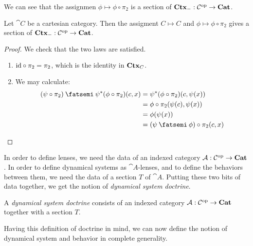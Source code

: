 \documentclass[DynamicalBook]{subfiles}
\begin{document}
We can see that the assignmen $\phi \mapsto \phi \circ \pi_2$ is a section of
$\textbf{Ctx}_{-} : \mathcal{C}^{\textnormal{op}} \to \textbf{Cat}$.
\begin{proposition}\label{prop.section_discrete}
Let $\cat{C}$ be a cartesian category. Then the assigment $C \mapsto C$ and
$\phi \mapsto \phi \circ \pi_2$ gives a section of $\textbf{Ctx}_{-} : \mathcal{C}^{\textnormal{op}} \to \textbf{Cat}$.
\end{proposition}
\begin{proof}
  We check that the two laws are satisfied.
  \begin{enumerate}
     \item $\mathrm{id} \circ \pi_2 = \pi_2$, which is the identity in $\textbf{Ctx}_{C}$.
     \item We may calculate:
       \begin{align*}
         (\psi \circ \pi_2) \then \psi^{\ast}(\phi \circ \pi_2)(c, x) &= \psi^{\ast}(\phi \circ \pi_2)(c, \psi(x)) \\
                                                                      &= \phi \circ \pi_2 (\psi(c), \psi(x)) \\
                                                                      &= \phi(\psi(x)) \\
         &= (\psi \then \phi) \circ \pi_2 (c, x)
       \end{align*}
  \end{enumerate}
\end{proof}

In order to define lenses, we need the data of an indexed category $\mathcal{A} :
\mathcal{C}^{\textnormal{op}} \to \textbf{Cat}$. In order to define dynamical systems as
$\cat{A}$-lenses, and to define the behaviors between them, we need the data of
a section $T$ of $\cat{A}$. Putting these two bits of data together, we get the
notion of \emph{dynamical system doctrine}.

\begin{definition}\label{def.doctrine}
A \emph{dynamical system doctrine} consists of an indexed category $\mathcal{A} :
\mathcal{C}^{\textnormal{op}} \to \textbf{Cat}$ together with a section $T$.
\end{definition}

Having this definition of doctrine in mind, we can now define the notion of
dynamical system and behavior in complete generality.
\end{document}
